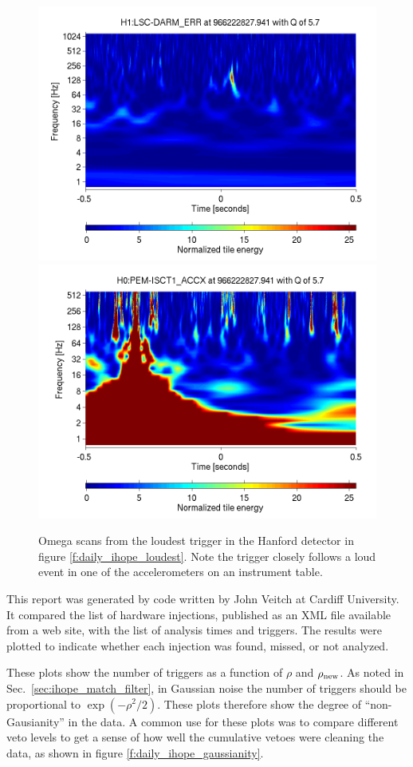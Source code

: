 \begin{figure}
  \includegraphics[width=0.5\linewidth]{figures/detchar/966222827_940673828_H1_LSC-DARM_ERR_1_00_spectrogram_whitened.png}
  \includegraphics[width=0.5\linewidth]{figures/detchar/966222827_940673828_H0_PEM-ISCT1_ACCX_1_00_spectrogram_whitened.png}
  \caption[Omega scans from the loudest H1 trigger in figure \ref{f:daily_ihope_loudest}]{
  \label{f:daily_ihope_loudest_omega}
Omega scans from the loudest trigger in the Hanford detector in figure
\ref{f:daily_ihope_loudest}.
Note the trigger closely follows a loud
event in one of the accelerometers on an instrument table.}
\end{figure}%



This report was generated by code written by John Veitch  at Cardiff
University.  It compared the list of hardware injections, published as
an XML file available from a web site, with the list of analysis times
and triggers.  The results were plotted to indicate whether each
injection was found, missed, or not analyzed.



These plots show the number of triggers as a function of $\rho$ and
$\rho_{\textrm{new}}$.  As noted in Sec.~\ref{sec:ihope_match_filter}, in Gaussian
noise the number of triggers should be proportional to
$\exp(-\rho^2/2)$.  These plots therefore show the degree of
``non-Gausianity'' in the data.  A common use for these plots was to
compare different veto levels to get a sense of how well the
cumulative vetoes were cleaning the data, as shown in figure
\ref{f:daily_ihope_gaussianity}.

